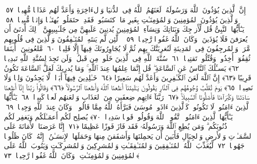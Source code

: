  إِنَّ ٱلَّذِينَ يُؤذُونَ ٱللَّهَ وَرَسُولَهُۥ لَعَنَهُمُ ٱللَّهُ فِى ٱلدُّنيَا وَٱلءَاخِرَةِ وَأَعَدَّ لَهُم عَذَابًۭا مُّهِينًۭا ﴿٥٧﴾
 وَٱلَّذِينَ يُؤذُونَ ٱلمُؤمِنِينَ وَٱلمُؤمِنَـٰتِ بِغَيرِ مَا ٱكتَسَبُوا۟ فَقَدِ ٱحتَمَلُوا۟ بُهتَـٰنًۭا وَإِثمًۭا مُّبِينًۭا ﴿٥٨﴾
 يَـٰٓأَيُّهَا ٱلنَّبِىُّ قُل لِّأَزوَٟجِكَ وَبَنَاتِكَ وَنِسَآءِ ٱلمُؤمِنِينَ يُدنِينَ عَلَيهِنَّ مِن جَلَـٰبِيبِهِنَّ ۚ ذَٟلِكَ أَدنَىٰٓ أَن يُعرَفنَ فَلَا يُؤذَينَ ۗ وَكَانَ ٱللَّهُ غَفُورًۭا رَّحِيمًۭا ﴿٥٩﴾
 ۞ لَّئِن لَّم يَنتَهِ ٱلمُنَـٰفِقُونَ وَٱلَّذِينَ فِى قُلُوبِهِم مَّرَضٌۭ وَٱلمُرجِفُونَ فِى ٱلمَدِينَةِ لَنُغرِيَنَّكَ بِهِم ثُمَّ لَا يُجَاوِرُونَكَ فِيهَآ إِلَّا قَلِيلًۭا ﴿٦٠﴾
 مَّلعُونِينَ ۖ أَينَمَا ثُقِفُوٓا۟ أُخِذُوا۟ وَقُتِّلُوا۟ تَقتِيلًۭا ﴿٦١﴾
 سُنَّةَ ٱللَّهِ فِى ٱلَّذِينَ خَلَوا۟ مِن قَبلُ ۖ وَلَن تَجِدَ لِسُنَّةِ ٱللَّهِ تَبدِيلًۭا ﴿٦٢﴾
 يَسـَٔلُكَ ٱلنَّاسُ عَنِ ٱلسَّاعَةِ ۖ قُل إِنَّمَا عِلمُهَا عِندَ ٱللَّهِ ۚ وَمَا يُدرِيكَ لَعَلَّ ٱلسَّاعَةَ تَكُونُ قَرِيبًا ﴿٦٣﴾
 إِنَّ ٱللَّهَ لَعَنَ ٱلكَـٰفِرِينَ وَأَعَدَّ لَهُم سَعِيرًا ﴿٦٤﴾
 خَـٰلِدِينَ فِيهَآ أَبَدًۭا ۖ لَّا يَجِدُونَ وَلِيًّۭا وَلَا نَصِيرًۭا ﴿٦٥﴾
 يَومَ تُقَلَّبُ وُجُوهُهُم فِى ٱلنَّارِ يَقُولُونَ يَـٰلَيتَنَآ أَطَعنَا ٱللَّهَ وَأَطَعنَا ٱلرَّسُولَا۠ ﴿٦٦﴾
 وَقَالُوا۟ رَبَّنَآ إِنَّآ أَطَعنَا سَادَتَنَا وَكُبَرَآءَنَا فَأَضَلُّونَا ٱلسَّبِيلَا۠ ﴿٦٧﴾
 رَبَّنَآ ءَاتِهِم ضِعفَينِ مِنَ ٱلعَذَابِ وَٱلعَنهُم لَعنًۭا كَبِيرًۭا ﴿٦٨﴾
 يَـٰٓأَيُّهَا ٱلَّذِينَ ءَامَنُوا۟ لَا تَكُونُوا۟ كَٱلَّذِينَ ءَاذَوا۟ مُوسَىٰ فَبَرَّأَهُ ٱللَّهُ مِمَّا قَالُوا۟ ۚ وَكَانَ عِندَ ٱللَّهِ وَجِيهًۭا ﴿٦٩﴾
 يَـٰٓأَيُّهَا ٱلَّذِينَ ءَامَنُوا۟ ٱتَّقُوا۟ ٱللَّهَ وَقُولُوا۟ قَولًۭا سَدِيدًۭا ﴿٧٠﴾
 يُصلِح لَكُم أَعمَـٰلَكُم وَيَغفِر لَكُم ذُنُوبَكُم ۗ وَمَن يُطِعِ ٱللَّهَ وَرَسُولَهُۥ فَقَد فَازَ فَوزًا عَظِيمًا ﴿٧١﴾
 إِنَّا عَرَضنَا ٱلأَمَانَةَ عَلَى ٱلسَّمَـٰوَٟتِ وَٱلأَرضِ وَٱلجِبَالِ فَأَبَينَ أَن يَحمِلنَهَا وَأَشفَقنَ مِنهَا وَحَمَلَهَا ٱلإِنسَـٰنُ ۖ إِنَّهُۥ كَانَ ظَلُومًۭا جَهُولًۭا ﴿٧٢﴾
 لِّيُعَذِّبَ ٱللَّهُ ٱلمُنَـٰفِقِينَ وَٱلمُنَـٰفِقَـٰتِ وَٱلمُشرِكِينَ وَٱلمُشرِكَـٰتِ وَيَتُوبَ ٱللَّهُ عَلَى ٱلمُؤمِنِينَ وَٱلمُؤمِنَـٰتِ ۗ وَكَانَ ٱللَّهُ غَفُورًۭا رَّحِيمًۢا ﴿٧٣﴾
 
